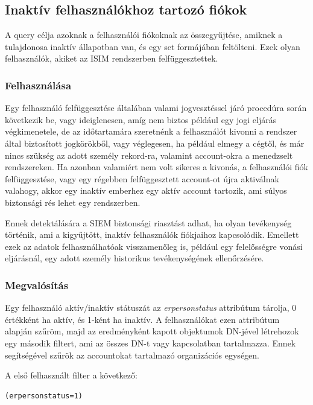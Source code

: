	
\subsection{Inaktív felhasználókhoz tartozó fiókok}
	A query célja azoknak a felhasználói fiókoknak az összegyűjtése, amiknek a tulajdonosa inaktív állapotban van, és egy set formájában feltölteni. Ezek olyan felhasználók, akiket az ISIM rendszerben felfüggesztettek.
	\subsubsection{Felhasználása}
	
		Egy felhasználó felfüggesztése általában valami jogvesztéssel járó procedúra során következik be, vagy ideiglenesen, amíg nem biztos például egy jogi eljárás végkimenetele, de az időtartamára szeretnénk a felhasználót kivonni a rendszer által biztosított jogkörökből, vagy véglegesen, ha például elmegy a cégtől, és már nincs szükség az adott személy rekord-ra, valamint account-okra a menedzselt rendszereken.
		Ha azonban valamiért nem volt sikeres a kivonás, a felhasználói fiók felfüggesztése, vagy egy régebben felfüggesztett account-ot újra aktiválnak valahogy, akkor egy inaktív emberhez egy aktív account tartozik, ami súlyos biztonsági rés lehet egy rendszerben.

		Ennek detektálására a SIEM biztonsági riasztást adhat, ha olyan tevékenység történik, ami a kigyűjtött, inaktív felhasználók fiókjaihoz kapcsolódik. Emellett ezek az adatok felhasználhatóak visszamenőleg is, például egy felelősségre vonási eljárásnál, egy adott személy historikus tevékenységének ellenőrzésére.
		 
	\subsubsection{Megvalósítás}
		
		Egy felhasználó aktív/inaktív státuszát az \textit{erpersonstatus} attribútum tárolja, 0 értékként ha aktív, és 1-ként ha inaktív. A felhasználókat ezen attribútum alapján szűröm, majd az eredményként kapott objektumok DN-jével létrehozok egy második filtert, ami az összes DN-t vagy kapcsolatban tartalmazza. Ennek segítségével szűrök az accountokat tartalmazó organizációs egységen.
		
		A első felhasznált filter a következő:
		\begin{lstlisting}
(erpersonstatus=1)\end{lstlisting}
		
